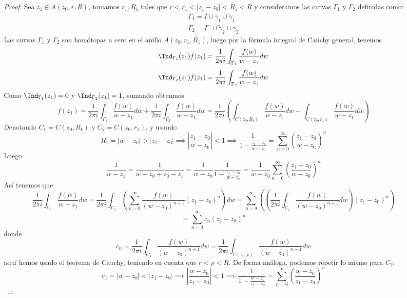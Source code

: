 \begin{proof}
    Sea $z_1 \in A(z_0, r, R)$, tomamos $r_1, R_1$ tales que $r < r_1 < |z_1 - z_0| < R_1 < R$ y consideramos las curvas $\Gamma_1$ y $\Gamma_2$ definidas como:
    \[
        \begin{matrix}
            \Gamma_1 = I \cup \gamma_1 \cup \tilde{\gamma}_1 \\
            \Gamma_2 = I^- \cup \tilde{\gamma}_2 \cup \gamma_2
        \end{matrix}
    \]
    Las curvas $\Gamma_1$ y $\Gamma_2$ son homótopas a cero en el anillo $A(z_0, r_1, R_1)$, luego por la fórmula integral de Cauchy general, tenemos
    \[
        \Ind_{\Gamma_1}(z_1) f(z_1) = \frac{1}{2 \pi i} \int_{\Gamma_1} \frac{f(w)}{w - z_1} dw
    \]
    \[
        \Ind_{\Gamma_2}(z_1) f(z_1) = \frac{1}{2 \pi i} \int_{\Gamma_2} \frac{f(w)}{w - z_1} dw
    \]
    Como $\Ind_{\Gamma_1}(z_1) = 0$ y $\Ind_{\Gamma_2}(z_1) = 1$, sumando obtenmos
    \[
        f(z_1) = \frac{1}{2 \pi i} \int_{\Gamma_1} \frac{f(w)}{w - z_1} dw + \frac{1}{2 \pi i} \int_{\Gamma_2} \frac{f(w)}{w - z_1} dw = \frac{1}{2 \pi i} \left(\int_{C(z_0, R_1)} \frac{f(w)}{w - z_1} dw - \int_{C(z_0, r_1)} \frac{f(w)}{w - z_1} dw \right)
    \] 
    Denotando $C_1 = C(z_0, R_1)$ y $C_2 = C(z_0, r_1)$, y usando 
    \[
        R_1 = |w - z_0| > |z_1 - z_0| \implies \left| \frac{z_1 - z_0}{w - z_0} \right| < 1 \implies \frac{1}{1 - \frac{z_1 - z_0}{w - z_0}} = \sum_{n=0}^{\infty} \left( \frac{z_1 - z_0}{w - z_0} \right)^n 
    \]
    Luego
    \[
        \frac{1}{w - z_1} = \frac{1}{w - z_0 + z_0 - z_1} = \frac{1}{w-z_0} \frac{1}{1 - \frac{z_1 - z_0}{w - z_0}} = \frac{1}{w - z_0} \sum_{n=0}^{\infty} \left( \frac{z_1 - z_0}{w - z_0} \right)^n
    \]
    Así tenemos que
    \[
        \frac{1}{2 \pi i} \int_{C_1} \frac{f(w)}{w - z_1} dw = \frac{1}{2 \pi i} \int_{C_1} \left(\sum_{n=0}^{\infty} \frac{f(w)}{(w - z_0)^{n+1}} (z_1 - z_0)^n \right) dw = \sum_{n=0}^{\infty} \left(\left( \frac{1}{2 \pi i} \int_{C_1} \frac{f(w)}{(w - z_0)^{n+1}} dw \right) (z_1 - z_0)^n\right) 
    \]
    \[
        = \sum_{n=0}^{\infty} c_n (z_1 - z_0)^n
    \]
    donde   
    \[
        c_n = \frac{1}{2 \pi i} \int_{C_1} \frac{f(w)}{(w - z_0)^{n+1}} dw = \frac{1}{2 \pi i} \int_{C(z_0, \rho)} \frac{f(w)}{(w - z_0)^{n+1}} dw
    \]
    aquí hemos usado el teorema de Cauchy, teniendo en cuenta que $r < \rho < R$.
    De forma análoga, podemos repetir lo mismo para $C_2$:
    \[
        r_1 = |w - z_0| < |z_1 - z_0| \implies \left| \frac{w - z_0}{z_1 - z_0} \right| < 1 \implies \frac{1}{1 - \frac{w - z_0}{z_1 - z_0}} = \sum_{n=0}^{\infty} \left( \frac{w - z_0}{z_1 - z_0} \right)^n
\]
\end{proof}
